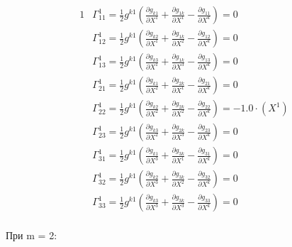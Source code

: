 \documentclass[a4paper, 12pt, oneside]{article}
\begin{document}
\begin{alignat*}{1}
  & \Gamma^1_{11} = \frac{1}{2}g^{k1}(\frac{\partial g_{k1}}{\partial X^1} + \frac{\partial g_{1k}}{\partial X^1} - \frac{\partial g_{11}}{\partial X^k}) = 0 \\
  & \Gamma^1_{12} = \frac{1}{2}g^{k1}(\frac{\partial g_{k2}}{\partial X^1} + \frac{\partial g_{1k}}{\partial X^2} - \frac{\partial g_{12}}{\partial X^k}) = 0 \\
  & \Gamma^1_{13} = \frac{1}{2}g^{k1}(\frac{\partial g_{k3}}{\partial X^1} + \frac{\partial g_{1k}}{\partial X^3} - \frac{\partial g_{13}}{\partial X^k}) = 0 \\
  & \Gamma^1_{21} = \frac{1}{2}g^{k1}(\frac{\partial g_{k1}}{\partial X^2} + \frac{\partial g_{2k}}{\partial X^1} - \frac{\partial g_{21}}{\partial X^k}) = 0 \\
  & \Gamma^1_{22} = \frac{1}{2}g^{k1}(\frac{\partial g_{k2}}{\partial X^2} + \frac{\partial g_{2k}}{\partial X^2} - \frac{\partial g_{22}}{\partial X^k}) = -1.0\cdot (X^1) \\
  & \Gamma^1_{23} = \frac{1}{2}g^{k1}(\frac{\partial g_{k3}}{\partial X^2} + \frac{\partial g_{2k}}{\partial X^3} - \frac{\partial g_{23}}{\partial X^k}) = 0 \\
  & \Gamma^1_{31} = \frac{1}{2}g^{k1}(\frac{\partial g_{k1}}{\partial X^3} + \frac{\partial g_{3k}}{\partial X^1} - \frac{\partial g_{31}}{\partial X^k}) = 0 \\
  & \Gamma^1_{32} = \frac{1}{2}g^{k1}(\frac{\partial g_{k2}}{\partial X^3} + \frac{\partial g_{3k}}{\partial X^2} - \frac{\partial g_{32}}{\partial X^k}) = 0 \\
  & \Gamma^1_{33} = \frac{1}{2}g^{k1}(\frac{\partial g_{k3}}{\partial X^3} + \frac{\partial g_{3k}}{\partial X^3} - \frac{\partial g_{33}}{\partial X^k}) = 0 
\end{alignat*}\\
При m = 2:\\
\end{document}
